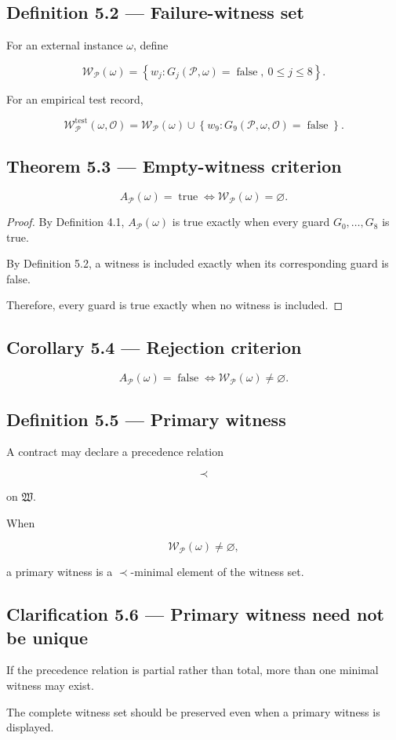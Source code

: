 \documentclass[11pt,oneside,openany]{book}
\newcommand{\PCsubsection}[1]{%
  \subsection*{#1}%
}
\begin{document}
\PCsubsection{Definition 5.2 --- Failure-witness set}

For an external instance \(\omega\), define

\[
\boxed{ \mathcal W_{\mathcal P}(\omega) = \left\{ w_j: G_j(\mathcal P,\omega)=\operatorname{false}, \ 0\leq j\leq8 \right\}. }
\]

For an empirical test record,

\[
\boxed{ \mathcal W_{\mathcal P}^{\mathrm{test}} (\omega,\mathcal O) = \mathcal W_{\mathcal P}(\omega) \cup \left\{ w_9: G_9(\mathcal P,\omega,\mathcal O)=\operatorname{false} \right\}. }
\]

\PCsubsection{Theorem 5.3 --- Empty-witness criterion}

\[
\boxed{ A_{\mathcal P}(\omega)=\operatorname{true} \iff \mathcal W_{\mathcal P}(\omega)=\varnothing. }
\]

\begin{proof}
By Definition 4.1, \(A_{\mathcal P}(\omega)\) is true exactly when every guard \(G_0,\ldots,G_8\) is true.

By Definition 5.2, a witness is included exactly when its corresponding guard is false.

Therefore, every guard is true exactly when no witness is included.

\end{proof}

\PCsubsection{Corollary 5.4 --- Rejection criterion}

\[
\boxed{ A_{\mathcal P}(\omega)=\operatorname{false} \iff \mathcal W_{\mathcal P}(\omega)\neq\varnothing. }
\]

\PCsubsection{Definition 5.5 --- Primary witness}

A contract may declare a precedence relation

\[
\prec
\]

on \(\mathfrak W\).

When

\[
\mathcal W_{\mathcal P}(\omega)\neq\varnothing,
\]

a primary witness is a \(\prec\)-minimal element of the witness set.

\PCsubsection{Clarification 5.6 --- Primary witness need not be unique}

If the precedence relation is partial rather than total, more than one minimal witness may exist.

The complete witness set should be preserved even when a primary witness is displayed.
\end{document}
